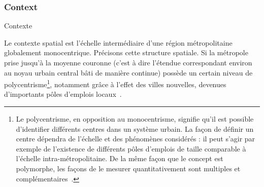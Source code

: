 


\subsubsection{Context}{Contexte}

Le contexte spatial est l'échelle intermédiaire d'une région métropolitaine globalement monocentrique. Précisons cette structure spatiale. Si la métropole prise jusqu'à la moyenne couronne (c'est à dire l'étendue correspondant environ au noyau urbain central bâti de manière continue) possède un certain niveau de polycentrisme\footnote{Le polycentrisme, en opposition au monocentrisme, signifie qu'il est possible d'identifier différents centres dans un système urbain. La façon de définir un centre dépendra de l'échelle et des phénomènes considérés : il peut s'agir par exemple de l'existence de différents pôles d'emplois de taille comparable à l'échelle intra-métropolitaine. De la même façon que le concept est polymorphe, les façons de le mesurer quantitativement sont multiples et complémentaires~\cite{servais2004polycentrisme}.}, notamment grâce à l'effet des villes nouvelles, devenues d'importants pôles d'emplois locaux~\cite{berroir2005contribution}.


